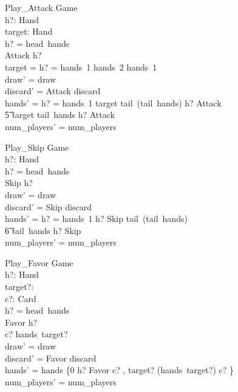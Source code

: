 \documentclass[11pt, fuzz]{article}
\begin{document}
\begin{schema}{Play\_Attack}
    \Delta Game \\
    h?: Hand \\
    target: Hand \\
\where
    h? = head~hands \\
    Attack \inbag h? \\
    target = \IF h? = hands~1 \THEN hands~2 \ELSE hands~1\\
    draw' = draw \\
    discard' = \langle Attack \rangle \cat discard \\
    hands' = \IF h? = hands~1 \THEN \langle target \rangle \cat tail~(tail~hands) \cat \langle h? \uminus \lbag Attack \rbag \rangle \\ \t5 \ELSE \langle target \rangle \cat tail~hands \cat \langle h? \uminus \lbag Attack \rbag \rangle  \\
    num\_players' = num\_players
\end{schema}

\begin{schema}{Play\_Skip}
    \Delta Game \\
    h?: Hand \\
\where
    h? = head~hands \\
    Skip \inbag h? \\
    draw' = draw \\ 
    discard' = \langle Skip \rangle \cat discard \\
    hands' = \IF h? = hands~1 \THEN \langle h? \uminus \lbag Skip \rbag \rangle \cat tail~(tail~hands) \\ \t6 \ELSE tail~hands \cat \langle h? \uminus \lbag Skip \rbag \rangle \\
    num\_players' = num\_players
\end{schema}


\begin{schema}{Play\_Favor}
    \Delta Game \\
    h?: Hand \\
    target?: \nat \\
    c?: Card \\
\where
    h? = head~hands \\
    Favor \inbag h? \\
    c? \inbag hands~target? \\
    draw' = draw \\
    discard' = \langle Favor \rangle \cat discard \\
    hands' = hands \oplus \{0 \mapsto h? \uminus \lbag Favor \rbag \uplus \lbag c? \rbag, target? \mapsto (hands~target?) \uminus \lbag c? \rbag\} \\
    num\_players' = num\_players 
\end{schema}
\end{document}

